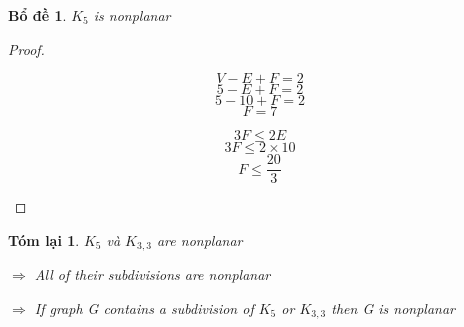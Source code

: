 \documentclass[12pt]{article}
\newtheorem{lemma}{Bổ đề}
\newtheorem*{recap}{Tóm lại}
\begin{document}
\begin{lemma}
    $K_5$ is nonplanar
\end{lemma}
\begin{proof}
    \begin{multicols}{3}
        $$V-E+F=2$$
        $$5-E+F=2$$
        $$5-10+F=2$$
        $$F=7$$

        $$3F \leq 2E$$
        $$3F \leq 2 \times 10$$
        $$F \leq \frac{20}{3}$$
    \end{multicols}
\end{proof}
\begin{recap}
    $K_5$ và $K_{3,3}$ are nonplanar

    $\Rightarrow$ All of their subdivisions are nonplanar

    $\Rightarrow$ If graph G contains a subdivision of $K_5$ or $K_{3,3}$ then G is nonplanar
\end{recap}
\end{document}
